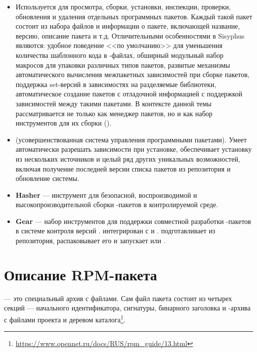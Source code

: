 \begin{itemize}
	\item {} Используется для просмотра, сборки, установки, инспекции, проверки, обновления и удаления отдельных программных пакетов. Каждый такой пакет состоит из набора файлов и информации о пакете, включающей название, версию, описание пакета и т.д. Отличительными особенностями  в Sisyphus являются: удобное поведение <<по умолчанию>> для уменьшения количества шаблонного кода в -файлах, обширный модульный набор макросов для упаковки различных типов пакетов, развитые механизмы автоматического вычисления межпакетных зависимостей при сборке пакетов, поддержка set-версий в зависимостях на разделяемые библиотеки, автоматическое создание пакетов с отладочной информацией с поддержкой зависимостей между такими пакетами. В контексте данной темы  рассматривается не только как менеджер пакетов, но и как набор инструментов для их сборки (). 
	
	\item {} (усовершенствованная система управления программными пакетами). Умеет автоматически разрешать зависимости при установке, обеспечивает установку из нескольких источников и целый ряд других уникальных возможностей, включая получение последней версии списка пакетов из репозитория и обновление системы.
	
	\item \textbf{Hasher} --- инструмент для безопасной, воспроизводимой и высокопроизводительной сборки -пакетов в контролируемой среде.
	
	\item \textbf{Gear} --- набор инструментов для поддержки совместной разработки -пакетов в системе контроля версий .  интегрирован с  и .  подготавливает  из  репозитория, распаковывает его и запускает  или .
\end{itemize}


\section{Описание RPM-пакета}
 --- это специальный архив с файлами. Сам файл пакета состоит из четырех секций --- начального идентификатора, сигнатуры, бинарного заголовка и -архива с файлами проекта и деревом каталога\footnote{\href{https://www.opennet.ru/docs/RUS/rpm_guide/13.html}{https://www.opennet.ru/docs/RUS/rpm\_guide/13.html}}.

